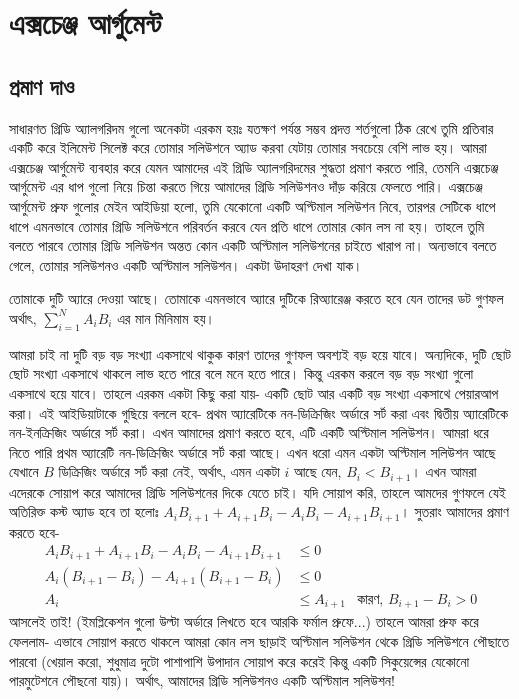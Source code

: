 \chapter{এক্সচেঞ্জ আর্গুমেন্ট}

\section{প্রমাণ দাও}

সাধারণত গ্রিডি অ্যালগরিদম গুলো অনেকটা এরকম হয়ঃ যতক্ষণ পর্যন্ত সম্ভব প্রদত্ত শর্তগুলো ঠিক রেখে তুমি প্রতিবার একটি করে ইলিমেন্ট সিলেক্ট করে তোমার সলিউশনে অ্যাড করবা যেটায় তোমার সবচেয়ে বেশি লাভ হয়। আমরা এক্সচেঞ্জ আর্গুমেন্ট ব্যবহার করে যেমন আমাদের এই গ্রিডি অ্যালগরিদমের শুদ্ধতা প্রমাণ করতে পারি, তেমনি এক্সচেঞ্জ আর্গুমেন্ট এর ধাপ গুলো নিয়ে চিন্তা করতে গিয়ে আমাদের গ্রিডি সলিউশনও দাঁড় করিয়ে ফেলতে পারি। এক্সচেঞ্জ আর্গুমেন্ট প্রুফ গুলোর মেইন আইডিয়া হলো, তুমি যেকোনো একটি অপ্টিমাল সলিউশন নিবে, তারপর সেটিকে ধাপে ধাপে এমনভাবে তোমার গ্রিডি সলিউশনে পরিবর্তন করবে যেন প্রতি ধাপে তোমার কোন লস না হয়। তাহলে তুমি বলতে পারবে তোমার গ্রিডি সলিউশন অন্তত কোন একটি অপ্টিমাল সলিউশনের চাইতে খারাপ না। অন্যভাবে বলতে গেলে, তোমার সলিউশনও একটি অপ্টিমাল সলিউশন। একটা উদাহরণ দেখা যাক।

\begin{problem}[ডট প্রডাক্ট মিনিমাইজেশন]
তোমাকে দুটি অ্যারে দেওয়া আছে। তোমাকে এমনভাবে অ্যারে দুটিকে রিঅ্যারেঞ্জ করতে হবে যেন তাদের ডট গুণফল অর্থাৎ, $\sum_{i=1}^{N} A_i B_i$ এর মান মিনিমাম হয়।
\end{problem}
\begin{solution}
আমরা চাই না দুটি বড় বড় সংখ্যা একসাথে থাকুক কারণ তাদের গুণফল অবশ্যই বড় হয়ে যাবে। অন্যদিকে, দুটি ছোট ছোট সংখ্যা একসাথে থাকলে লাভ হতে পারে বলে মনে হতে পারে। কিন্তু এরকম করলে বড় বড় সংখ্যা গুলো একসাথে হয়ে যাবে। তাহলে এরকম একটা কিছু করা যায়- একটি ছোট আর একটি বড় সংখ্যা একসাথে পেয়ারআপ করা। এই আইডিয়াটাকে গুছিয়ে বললে হবে- প্রথম অ্যারেটিকে নন-ডিক্রিজিং অর্ডারে সর্ট করা এবং দ্বিতীয় অ্যারেটিকে নন-ইনক্রিজিং অর্ডারে সর্ট করা। এখন আমাদের প্রমাণ করতে হবে, এটি একটি অপ্টিমাল সলিউশন। আমরা ধরে নিতে পারি প্রথম অ্যারেটি নন-ডিক্রিজিং অর্ডারে সর্ট করা আছে। এখন ধরো এমন একটা অপ্টিমাল সলিউশন আছে যেখানে $B$ ডিক্রিজিং অর্ডারে সর্ট করা নেই, অর্থাৎ, এমন একটা $i$ আছে যেন, $B_{i} < B_{i+1}$।  এখন আমরা এদেরকে সোয়াপ করে আমাদের গ্রিডি সলিউশনের দিকে যেতে চাই। যদি সোয়াপ করি, তাহলে আমদের গুণফলে যেই অতিরিক্ত কস্ট অ্যাড হবে তা হলোঃ $A_iB_{i+1} + A_{i+1}B_i - A_iB_i - A_{i+1}B_{i+1}$।  সুতরাং আমাদের প্রমাণ করতে হবে-
\begin{align*}
	A_iB_{i+1} + A_{i+1}B_i - A_iB_i - A_{i+1}B_{i+1} &\le 0 & \\
	A_i(B_{i+1} - B_i) - A_{i+1}(B_{i+1} - B_i) &\le 0\\
	A_i &\le A_{i+1} &\text{কারণ, $B_{i+1} - B_i > 0$}
\end{align*}
আসলেই তাই! (ইমপ্লিকেশন গুলো উল্টা অর্ডারে লিখতে হবে আরকি ফর্মাল প্রুফে...) তাহলে আমরা প্রুফ করে ফেললাম- এভাবে সোয়াপ করতে থাকলে আমরা কোন লস ছাড়াই অপ্টিমাল সলিউশন থেকে গ্রিডি সলিউশনে পৌছাতে পারবো (খেয়াল করো, শুধুমাত্র দুটো পাশাপাশি উপাদান সোয়াপ করে করেই কিন্তু একটি সিকুয়েন্সের যেকোনো পারমুটেশনে পৌছনো যায়)। অর্থাৎ, আমাদের গ্রিডি সলিউশনও একটি অপ্টিমাল সলিউশন!
\end{solution}


